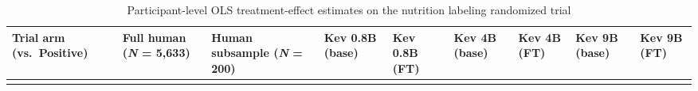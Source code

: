 \documentclass[
  11pt,
  letterpaper,
]{article}
\makeatletter
\newcommand\table@defaultsize{\footnotesize}
\let\table@size\table@defaultsize
\newcommand\nexttablesize[1]{\gdef\table@size{#1}}
\makeatother
\begin{document}
\nexttablesize{\scriptsize}
{\def\LTcaptype{apptbl}
\begin{longtable}[]{@{}
  >{\raggedright\arraybackslash}p{}
  >{\raggedleft\arraybackslash}p{}
  >{\raggedleft\arraybackslash}p{}
  >{\raggedleft\arraybackslash}p{}
  >{\raggedleft\arraybackslash}p{}
  >{\raggedleft\arraybackslash}p{}
  >{\raggedleft\arraybackslash}p{}
  >{\raggedleft\arraybackslash}p{}
  >{\raggedleft\arraybackslash}p{}@{}}
\caption{{\label{apptbl-grummon2025-coefs}}Participant-level OLS
treatment-effect estimates on the nutrition labeling randomized trial}\tabularnewline
\toprule\noalign{}
\begin{minipage}[b]{\linewidth}\raggedright
Trial arm (vs.~Positive)
\end{minipage} & \begin{minipage}[b]{\linewidth}\raggedleft
Full human (\emph{N} = 5,633)
\end{minipage} & \begin{minipage}[b]{\linewidth}\raggedleft
Human subsample (\emph{N} = 200)
\end{minipage} & \begin{minipage}[b]{\linewidth}\raggedleft
Kev 0.8B (base)
\end{minipage} & \begin{minipage}[b]{\linewidth}\raggedleft
Kev 0.8B (FT)
\end{minipage} & \begin{minipage}[b]{\linewidth}\raggedleft
Kev 4B (base)
\end{minipage} & \begin{minipage}[b]{\linewidth}\raggedleft
Kev 4B (FT)
\end{minipage} & \begin{minipage}[b]{\linewidth}\raggedleft
Kev 9B (base)
\end{minipage} & \begin{minipage}[b]{\linewidth}\raggedleft
Kev 9B (FT)
\end{minipage} \\
\midrule\noalign{}
\endfirsthead
\toprule\noalign{}
\begin{minipage}[b]{\linewidth}\raggedright

\end{minipage}
\end{longtable}}
\end{document}
